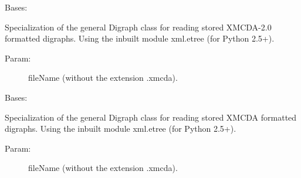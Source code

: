 \documentclass[letterpaper,10pt,english]{sphinxmanual}
\begin{document}

\begin{fulllineitems}
\label{techDoc:digraphs.XMCDA2Digraph}
Bases: {\hyperref[techDoc:digraphs.Digraph]{\emph{}}}

Specialization of the general Digraph class for reading
stored XMCDA-2.0 formatted digraphs. Using the inbuilt module
xml.etree (for Python 2.5+).
\begin{description}
\item[{Param:}] \leavevmode
fileName (without the extension .xmcda).

\end{description}

\begin{fulllineitems}
\label{techDoc:digraphs.XMCDA2Digraph.showAll}
\end{fulllineitems}


\end{fulllineitems}


\begin{fulllineitems}
\label{techDoc:digraphs.XMCDADigraph}
Bases: {\hyperref[techDoc:digraphs.Digraph]{\emph{}}}

Specialization of the general Digraph class for reading
stored XMCDA formatted digraphs. Using the inbuilt module
xml.etree (for Python 2.5+).
\begin{description}
\item[{Param:}] \leavevmode
fileName (without the extension .xmcda).

\end{description}

\begin{fulllineitems}
\label{techDoc:digraphs.XMCDADigraph.showAll}
\end{fulllineitems}


\end{fulllineitems}

\end{document}
